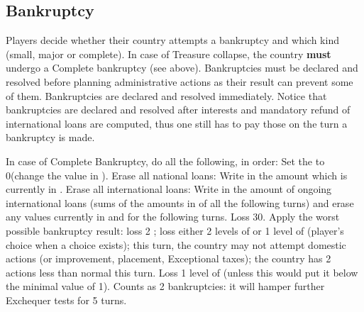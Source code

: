 \subsection{Bankruptcy}\label{chAdministration:bankruptcy}

\aparag Players decide whether their country attempts a bankruptcy and which
kind (small, major or complete).
\bparag In case of Treasure collapse, the country \textbf{must} undergo a
Complete bankruptcy (see above).
\bparag Bankruptcies must be declared and resolved before planning
administrative actions as their result can prevent some of them.
\bparag Bankruptcies are declared and resolved immediately.
\bparag Notice that bankruptcies are declared and resolved after interests and
mandatory refund of international loans are computed, thus one still has to
pay those on the turn a bankruptcy is made.

 In case of Complete Bankruptcy, do all the
following, in order:
\bparag Set the \RT to 0\ducats (change the value in ).
\bparag Erase all national loans: Write in  the amount which is currently in .
\bparag Erase all international loans: Write in  the amount of ongoing international loans (sums of the amounts
in  of all the following turns) and
erase any values currently in  and
 for the following turns.
\bparag Loss 30\VPs.
\bparag Apply the worst possible bankruptcy result: loss 2 \STAB; loss either
2 levels of \TradeFLEET or 1 level of \MNU (player's choice when a choice
exists); this turn, the country may not attempt domestic actions (\DTI or \FTI
improvement, \MNU placement, Exceptional taxes); the country has 2 \TFI
actions less than normal this turn.
\bparag Loss 1 level of \DTI (unless this would put it below the minimal value
of 1).
\bparag Counts as 2 bankruptcies: it will hamper further Exchequer tests for 5
turns.

